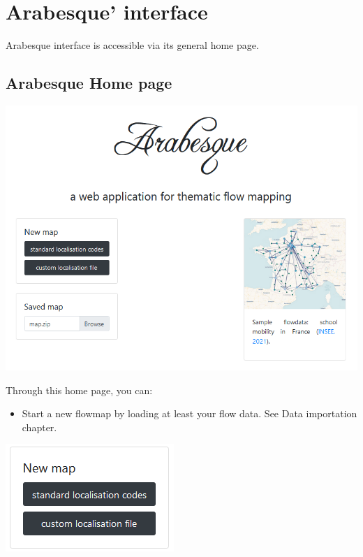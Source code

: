 \documentclass[
  letterpaper,
  DIV=11,
  numbers=noendperiod]{scrreprt}
\providecommand{\tightlist}{%
  \setlength{\itemsep}{0pt}\setlength{\parskip}{0pt}}\usepackage{longtable,booktabs,array}
\begin{document}
\chapter{Arabesque' interface}\label{arabesque-interface}

Arabesque interface is accessible via its general home page.

\section{Arabesque Home page}\label{arabesque-home-page}

\includegraphics{images/Arabesque_homepage.png}

Through this home page, you can:

\begin{itemize}
\tightlist
\item
  Start a new flowmap by loading at least your flow data. See Data
  importation chapter.
\end{itemize}

\includegraphics{images/Arabesque_homepage_newmap.png}
\end{document}
